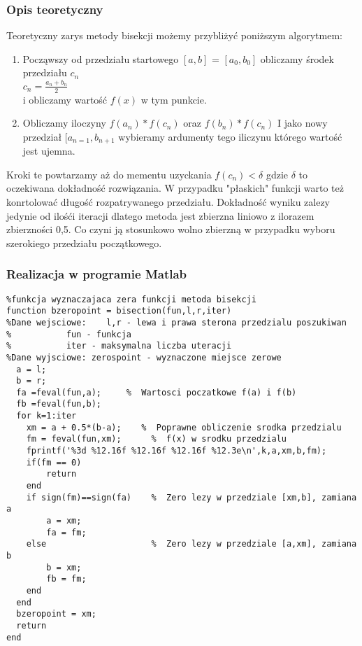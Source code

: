 \documentclass[a4paper, 11pt]{article}
\begin{document}
\subsubsection{Opis teoretyczny}
Teoretyczny zarys metody bisekcji możemy przybliżyć poniższym algorytmem:
\begin{enumerate}
  \item Począwszy od przedziału startowego $[a,b]$ = $[a_{0},b_{0}]$ obliczamy środek przedziału $c_{n}$\\
  $c_{n} = \frac{a_{n}+b_{n}}{2}$\\
  i obliczamy wartość $f(x)$ w tym punkcie. 
  \item Obliczamy iloczyny $f(a_{n})*f(c_{n})$ oraz $f(b_{n})*f(c_{n})$ I jako nowy przedział $[a_{n=1},b_{n+1}$
  wybieramy ardumenty tego iliczynu którego wartość jest ujemna. 
\end{enumerate} 
Kroki te powtarzamy aż do mementu uzyckania $f(c_{n})<\delta$ gdzie $\delta$ to oczekiwana dokładność rozwiązania. W przypadku "płaskich" funkcji warto też konrtolować długość rozpatrywanego przedziału. 
Dokładność wyniku zalezy jedynie od ilośći iteracji dlatego metoda jest zbierzna liniowo z ilorazem zbierzności 0,5. Co czyni ją stosunkowo wolno zbierzną w przypadku wyboru szerokiego przedziału początkowego. 



\subsubsection{Realizacja w programie Matlab}
\begin{lstlisting}
%funkcja wyznaczajaca zera funkcji metoda bisekcji
function bzeropoint = bisection(fun,l,r,iter)
%Dane wejsciowe:	l,r - lewa i prawa sterona przedzialu poszukiwan
%			fun - funkcja 
%			iter - maksymalna liczba uteracji
%Dane wyjsciowe: zerospoint - wyznaczone miejsce zerowe
  a = l; 
  b = r;
  fa =feval(fun,a);     %  Wartosci poczatkowe f(a) i f(b)
  fb =feval(fun,b);
  for k=1:iter
    xm = a + 0.5*(b-a);    %  Poprawne obliczenie srodka przedzialu
    fm = feval(fun,xm);      %  f(x) w srodku przedzialu
    fprintf('%3d %12.16f %12.16f %12.16f %12.3e\n',k,a,xm,b,fm);
    if(fm == 0)
        return
    end
    if sign(fm)==sign(fa)    %  Zero lezy w przedziale [xm,b], zamiana a
        a = xm;
        fa = fm;
    else                     %  Zero lezy w przedziale [a,xm], zamiana b
        b = xm;
        fb = fm;
    end
  end
  bzeropoint = xm; 
  return
end
\end{lstlisting}
\end{document}
